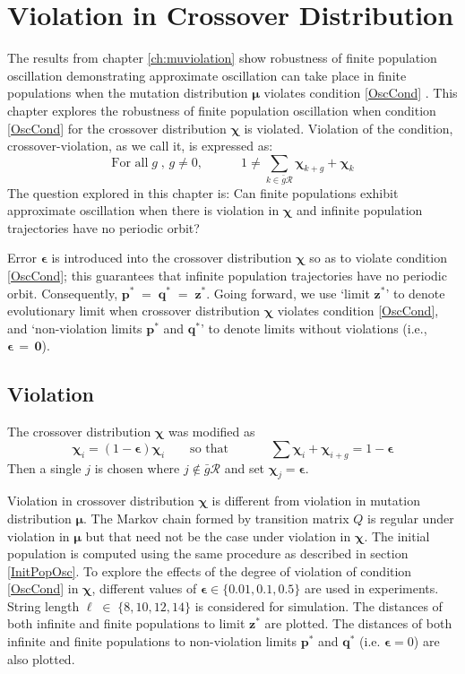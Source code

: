 \chapter{Violation in Crossover Distribution} \label{ch:chiviolation}
The results from chapter \ref{ch:muviolation} show robustness of finite population oscillation 
demonstrating approximate oscillation can take place in finite populations 
when the mutation distribution $\bm{\mu}$ violates condition \ref{OscCond} .  
This chapter explores the robustness of finite population oscillation when condition \ref{OscCond} 
for the crossover distribution $\bm{\chi}$ is violated.
Violation of the condition, crossover-violation, as we call it, is expressed as:
\begin{equation}
\text{For all} \;g\;, \,g \neq 0, \quad \quad \quad
\label{chi-violation}
  1 \neq \sum \limits_{k \in \bar{g}\mathcal{R}} \bm{\chi}_{k+g} + \bm{\chi}_k  
\end{equation}
The question explored in this chapter is: Can finite populations exhibit approximate oscillation when there is violation in $\bm{\chi}$ 
and infinite population trajectories
have no periodic orbit?

Error $\bm{\epsilon}$ is introduced into the crossover distribution $\bm{\chi}$ so as to 
violate condition \ref{OscCond}; this guarantees that 
infinite population trajectories have no periodic orbit. Consequently, $\bm{p}^\ast \;=\; \bm{q}^\ast \;=\; \bm{z}^\ast$. 
Going forward, we use `limit $\bm{z}^\ast$' to denote evolutionary limit when crossover distribution 
$\bm{\chi}$ violates condition \ref{OscCond}, and 
`non-violation limits $\bm{p}^\ast$ and $\bm{q}^\ast$' to denote limits without violations (i.e., $\bm{\epsilon \,=\, 0}$).

\section{Violation}
The crossover distribution $\bm{\chi}$ was modified as 
\begin{equation*}
\bm{\chi}_i = (1-\bm{\epsilon}) \bm{\chi}_i \quad \quad
\text{so that } \quad \quad \quad \sum \bm{\chi}_i + \bm{\chi}_{i+g} = 1-\bm{\epsilon}  
\end{equation*}  
Then a single $j$ is chosen where $j \not\in \bar{g}\mathcal{R}$ and set $\bm{\chi}_j = \bm{\epsilon}$. 

Violation in crossover distribution $\bm{\chi}$ is different from violation in mutation distribution $\bm{\mu}$. 
The Markov chain formed by transition matrix $Q$ is regular under violation in $\bm{\mu}$ 
but that need not be the case under violation in  $\bm{\chi}$. 
The initial population is 
computed using the same procedure as described in section \ref{InitPopOsc}. To explore the effects of the degree  
of violation of condition \ref{OscCond} in $\bm{\chi}$, different values of $\bm{\epsilon} \in \{0.01, 0.1, 0.5\} $ are used in experiments. 
String length $\ell \;\in\; \{8, 10, 12, 14\}$ is considered for simulation.
The distances of both infinite and finite populations to limit $\bm{z}^\ast$ are plotted. 
The distances of both infinite and finite populations to 
non-violation limits $\bm{p}^\ast$ and $\bm{q}^\ast$ (i.e. $\bm{\epsilon} = 0$) are also plotted.

